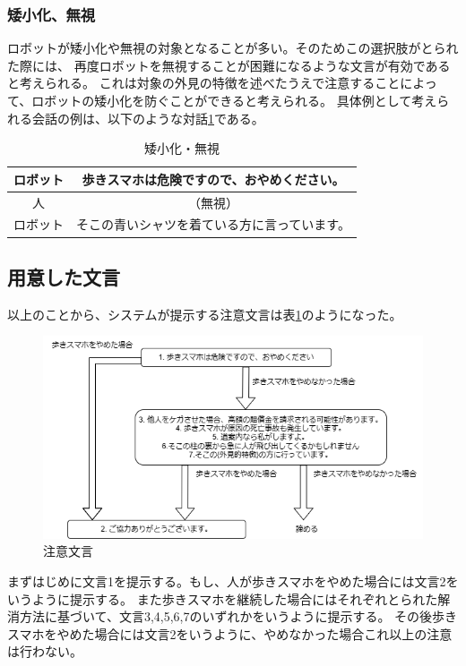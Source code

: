 \documentclass{kuisthesis}
\begin{document}
\subsubsection{矮小化、無視}
ロボットが矮小化や無視の対象となることが多い\cite{Schneider2022}。そのためこの選択肢がとられた際には、
再度ロボットを無視することが困難になるような文言が有効であると考えられる。
これは対象の外見の特徴を述べたうえで注意することによって、ロボットの矮小化を防ぐことができると考えられる。
具体例として考えられる会話の例は、以下のような対話\ref{dialogue: Ignore}である。
\begin{table}[H]
  \centering
  
  
  \begin{tabular}{c|c}
      ロボット & 歩きスマホは危険ですので、おやめください。 \\ \hline
      人 & （無視） \\ \hline
      ロボット & そこの青いシャツを着ている方に言っています。 \\ 
  \end{tabular}
  \caption{矮小化・無視}
  \label{dialogue: Ignore}
\end{table}


\subsection{用意した文言}
以上のことから、システムが提示する注意文言は表\ref{fig: Strategy}のようになった。
\begin{figure}[h]
  
  \includegraphics[width=15cm]{img/waystostop.drawio.png}
  \caption{注意文言}
  \label{fig: Strategy}

\end{figure}
まずはじめに文言1を提示する。もし、人が歩きスマホをやめた場合には文言2をいうように提示する。
また歩きスマホを継続した場合にはそれぞれとられた解消方法に基づいて、文言3,4,5,6,7のいずれかをいうように提示する。
その後歩きスマホをやめた場合には文言2をいうように、やめなかった場合これ以上の注意は行わない。
\end{document}
